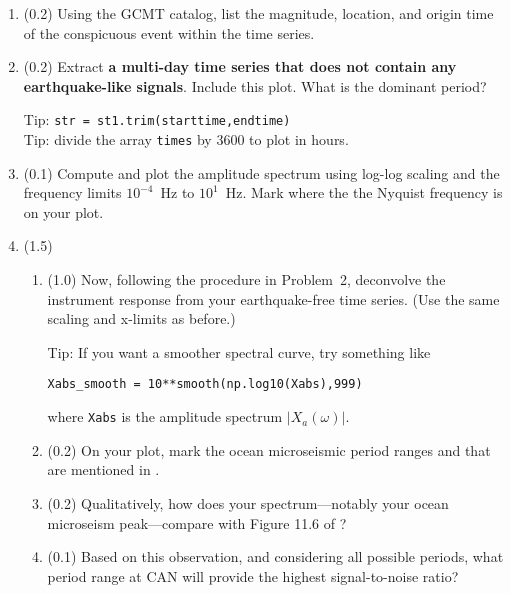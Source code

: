 \documentclass[11pt,titlepage,fleqn]{article}
\begin{document}
\begin{enumerate}
\item (0.2) Using the GCMT catalog, list the magnitude, location, and origin time of the conspicuous event within the time series. 

\item (0.2) Extract {\bf a multi-day time series that does not contain any earthquake-like signals}. Include this plot. What is the dominant period?

Tip: \verb+str = st1.trim(starttime,endtime)+ \\
Tip: divide the array \verb+times+ by 3600 to plot in hours.

\item (0.1) Compute and plot the amplitude spectrum using log-log scaling and the frequency limits $10^{-4}$~Hz to $10^1$~Hz. Mark where the the Nyquist frequency is on your plot.

\item (1.5)

\begin{enumerate}
\item (1.0) Now, following the procedure in Problem~2, deconvolve the instrument response from your earthquake-free time series. (Use the same scaling and x-limits as before.)

Tip: If you want a smoother spectral curve, try something like

\noindent
\verb+Xabs_smooth = 10**smooth(np.log10(Xabs),999)+

\noindent
where \verb+Xabs+ is the amplitude spectrum $|X_a(\omega)|$.

\item (0.2) On your plot, mark the ocean microseismic period ranges  and  that are mentioned in \citet[][Section 11.2]{ShearerE2}.

\item (0.2) Qualitatively, how does your spectrum---notably your ocean microseism peak---compare with Figure 11.6 of \citet{ShearerE2}?

\item (0.1) Based on this observation, and considering all possible periods, what period range at CAN will provide the highest signal-to-noise ratio?

\end{enumerate}

\end{enumerate}
\end{document}
